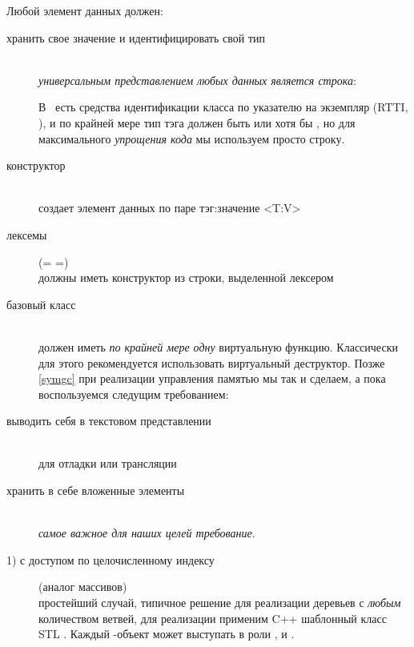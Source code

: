 \clearpage
Любой элемент данных должен:
\begin{description}
\item[хранить свое значение и идентифицировать свой тип]\ \\\emph{универсальным
представлением любых данных является строка}:

В \cpp\ есть средства идентификации класса по указателю на экземпляр (RTTI,
), и по крайней мере тип тэга должен быть  или
хотя бы , но для максимального \emph{упрощения кода} мы
используем просто строку.

\item[конструктор]\ \\создает элемент данных по паре тэг:значение <T:V>
\item[лексемы] (= =)\ \\должны иметь конструктор из
строки, выделенной лексером
\clearpage
\item[базовый класс]\ \\должен иметь \emph{по крайней мере одну} виртуальную
функцию. Классически для этого рекомендуется использовать виртуальный
деструктор. Позже \ref{symgc} при реализации управления памятью мы так и
сделаем, а пока воспользуемся следущим требованием:
\item[выводить себя в текстовом представлении]\ \\для отладки или трансляции

\item[хранить в себе вложенные элементы]\ \\\emph{самое важное для наших целей
требование}. 

\item[1) с доступом по целочисленному индексу] (аналог массивов)\ \\
простейший случай, типичное решение для реализации деревьев с \emph{любым}
количеством ветвей, для реализации применим C++ шаблонный класс STL
. Каждый -объект может выступать
в роли ,  и
.


\end{description}
